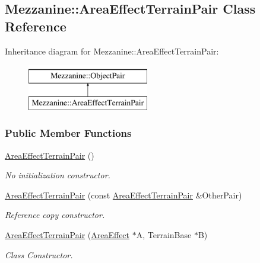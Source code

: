 \hypertarget{classMezzanine_1_1AreaEffectTerrainPair}{
\subsection{Mezzanine::AreaEffectTerrainPair Class Reference}
\label{classMezzanine_1_1AreaEffectTerrainPair}
}
Inheritance diagram for Mezzanine::AreaEffectTerrainPair:\begin{figure}[H]
\begin{center}
\leavevmode
\includegraphics[height=2.000000cm]{classMezzanine_1_1AreaEffectTerrainPair}
\end{center}
\end{figure}
\subsubsection*{Public Member Functions}
\begin{DoxyCompactItemize}
\item 
\hypertarget{classMezzanine_1_1AreaEffectTerrainPair_a2bde1985c7e06838aaad72e50898168e}{
\hyperlink{classMezzanine_1_1AreaEffectTerrainPair_a2bde1985c7e06838aaad72e50898168e}{AreaEffectTerrainPair} ()}
\label{classMezzanine_1_1AreaEffectTerrainPair_a2bde1985c7e06838aaad72e50898168e}

\begin{DoxyCompactList}\small\item\em No initialization constructor. \item\end{DoxyCompactList}\item 
\hyperlink{classMezzanine_1_1AreaEffectTerrainPair_a64791bc5ed36c7bb9c95ab4d7e4a08d1}{AreaEffectTerrainPair} (const \hyperlink{classMezzanine_1_1AreaEffectTerrainPair}{AreaEffectTerrainPair} \&OtherPair)
\begin{DoxyCompactList}\small\item\em Reference copy constructor. \item\end{DoxyCompactList}\item 
\hyperlink{classMezzanine_1_1AreaEffectTerrainPair_ad3fe92b0fd4fb4478b5a75781eb67e6b}{AreaEffectTerrainPair} (\hyperlink{classMezzanine_1_1AreaEffect}{AreaEffect} $\ast$A, TerrainBase $\ast$B)
\begin{DoxyCompactList}\small\item\em Class Constructor. \item\end{DoxyCompactList}\end{DoxyCompactItemize}
